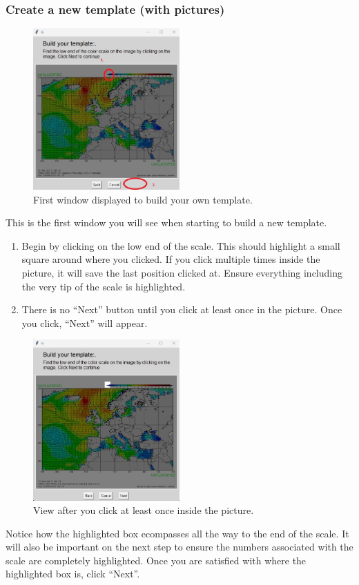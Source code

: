 \subsubsection{Create a new template (with pictures)}
\begin{figure}[H]
\centering\includegraphics[width=0.5\textwidth]{TeX/Build_Template1.jpg}
\caption{First window displayed to build your own template.}
\end{figure}
This is the first window you will see when starting to build a new template.
\begin{enumerate}
    \item Begin by clicking on the low end of the scale.  This should highlight a small square around where you clicked.  If you click multiple times inside the picture, it will save the last position clicked at.  Ensure everything including the very tip of the scale is highlighted.
    \item There is no ``Next'' button until you click at least once in the picture.  Once you click, ``Next'' will appear.
\end{enumerate}

\newpage
\begin{figure}[H]
    \centering\includegraphics[width=0.5\textwidth]{TeX/Build_Template2.jpg}
    \caption{View after you click at least once inside the picture.}
\end{figure}
Notice how the highlighted box ecompasses all the way to the end of the scale. It will also be important on the next step to ensure the numbers associated with the scale are completely highlighted.  Once you are satisfied with where the highlighted box is, click ``Next''.

